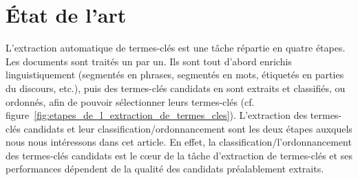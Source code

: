 \section{État de l'art}
\label{sec:etat_de_l_art}
  L'extraction automatique de termes-clés est une tâche répartie en quatre
  étapes. Les documents sont traités un par un. Ils sont tout d'abord enrichis
  linguistiquement (segmentés en phrases, segmentés en mots, étiquetés en
  parties du discours, etc.), puis des termes-clés candidats en sont extraits et
  classifiés, ou ordonnés, afin de pouvoir sélectionner leurs termes-clés (cf.
  figure~\ref{fig:etapes_de_l_extraction_de_termes_cles}). L'extraction des
  termes-clés candidats et leur classification/ordonnancement sont les deux
  étapes auxquels nous nous intéressons dans cet article. En effet, la
  classification/l'ordonnancement des termes-clés candidats est le c\oe{}ur de
  la tâche d'extraction de termes-clés et ses performances dépendent de la
  qualité des candidats préalablement extraits.
